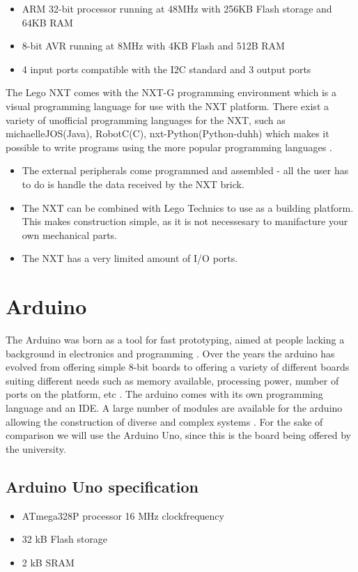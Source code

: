 \begin{itemize}
  \item ARM 32-bit processor running at 48MHz with 256KB Flash storage and 64KB RAM
  \item 8-bit AVR running at 8MHz with 4KB Flash and 512B RAM
  \item 4 input ports compatible with the I2C standard and 3 output ports
\end{itemize}

The Lego NXT comes with the NXT-G programming environment which is a visual
programming language for use with the NXT platform. There exist a variety of
unofficial programming languages for the NXT, such as michael{leJOS(Java), RobotC(C), nxt-Python(Python-duhh)}
which makes it possible to write programs using the more popular programming
languages \Source.

\begin{itemize}
  \item The external peripherals come programmed and assembled - all the user
  has to do is handle the data received by the NXT brick.
  \item The NXT can be combined with Lego Technics to use as a building
  platform. This makes construction simple, as it is not necessesary to
  manifacture your own mechanical parts.
  \item The NXT has a very limited amount of I/O ports.
\end{itemize}

\section{Arduino}
The Arduino was born as a tool for fast prototyping, aimed at people lacking a
background in electronics and programming \Source. Over the years the arduino has
evolved from offering simple 8-bit boards to offering a variety of different
boards suiting different needs such as memory available, processing power,
number of ports on the platform, etc \Source. The arduino comes with its
own programming language and an IDE. A large number of modules are available for
the arduino allowing the construction of diverse and complex systems \Source.
For the sake of comparison we will use the Arduino Uno, since this is the board being offered by
the university.

\subsection{Arduino Uno specification}
\Source
\begin{itemize}
  \item ATmega328P processor 16 MHz clockfrequency
  \item 32 kB Flash storage
  \item 2 kB SRAM
\end{itemize}

